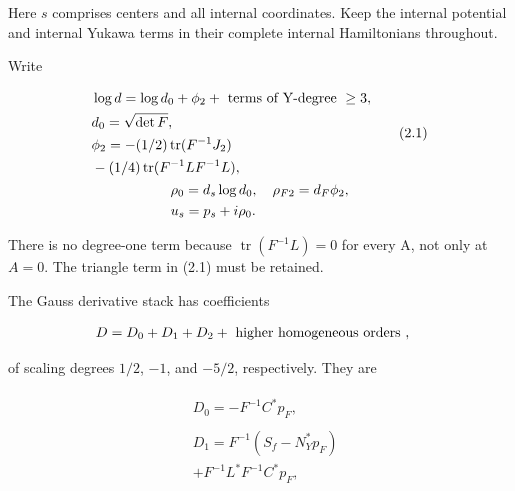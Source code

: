 Here \(s\) comprises centers and all internal coordinates. Keep the
internal potential and internal Yukawa terms in their complete internal
Hamiltonians throughout.

Write

\begin{gather*}
\begin{aligned}
& \log  d = \log  d_{0} + \phi _{2} + \text{ terms of Y-degree } \ge 3, \\
& d_{0}=\sqrt{\det  F}, \\
& \phi _{2}=-(1/2)\operatorname{tr} (F^{-1} J_{2}) \\
& -(1/4)\operatorname{tr} (F^{-1} L F^{-1} L),
\end{aligned}\tag{2.1} \\
\begin{aligned}
& \rho _{0}=d_{s} \log  d_{0}, \quad  \rho _{F2}=d_{F} \phi _{2}, \\
& u_{s}=p_{s}+i \rho _{0}.
\end{aligned}\notag
\end{gather*}

There is no degree-one term because \(\operatorname{tr} (F^{-1} L)=0\)
for every A, not only at \(A=0\). The triangle term in (2.1) must be
retained.

The Gauss derivative stack has coefficients

\begin{gather*}
\begin{aligned}
& D = D_{0} + D_{1} + D_{2} + \text{ higher homogeneous orders },
\end{aligned}\notag
\end{gather*}

of scaling degrees \(1/2\), \(-1\), and \(-5/2\), respectively. They are

\begin{gather*}
\begin{aligned}
& D_{0} = -F^{-1} C^{*} p_{F},
\end{aligned}\tag{2.2} \\
\begin{aligned}
& D_{1} = F^{-1}(S_{f}-N_{Y}^{*} p_{F}) \\
& +F^{-1} L^{*} F^{-1} C^{*} p_{F},
\end{aligned}\tag{2.3}
\end{gather*}

